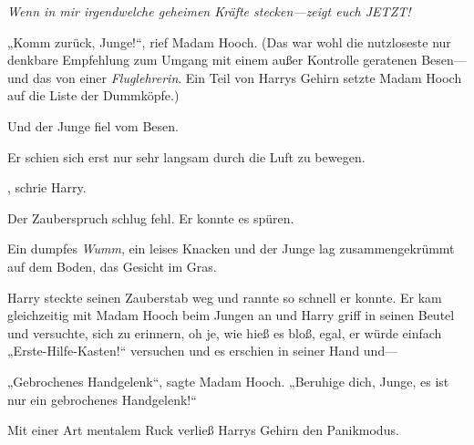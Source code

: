 \emph{Wenn in mir irgendwelche geheimen Kräfte stecken—zeigt euch JETZT!}

„Komm zurück, Junge!“, rief Madam Hooch. (Das war wohl die nutzloseste nur denkbare Empfehlung zum Umgang mit einem außer Kontrolle geratenen Besen—und das von einer \emph{Fluglehrerin}. Ein Teil von Harrys Gehirn setzte Madam Hooch auf die Liste der Dummköpfe.)

Und der Junge fiel vom Besen.

Er schien sich erst nur sehr langsam durch die Luft zu bewegen.

, schrie Harry.

Der Zauberspruch schlug fehl. Er konnte es spüren.

Ein dumpfes \emph{Wumm}, ein leises Knacken und der Junge lag zusammengekrümmt auf dem Boden, das Gesicht im Gras.

Harry steckte seinen Zauberstab weg und rannte so schnell er konnte. Er kam gleichzeitig mit Madam Hooch beim Jungen an und Harry griff in seinen Beutel und versuchte, sich zu erinnern, oh je, wie hieß es bloß, egal, er würde einfach „Erste-Hilfe-Kasten!“ versuchen und es erschien in seiner Hand und—

„Gebrochenes Handgelenk“, sagte Madam Hooch. „Beruhige dich, Junge, es ist nur ein gebrochenes Handgelenk!“

Mit einer Art mentalem Ruck verließ Harrys Gehirn den Panikmodus.

